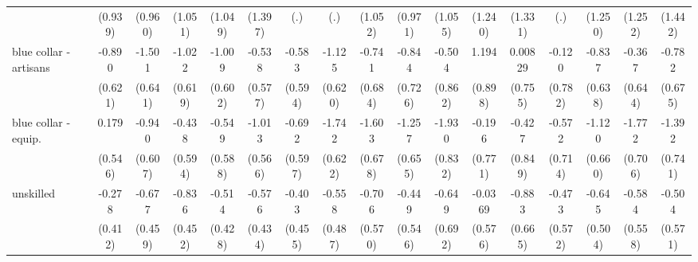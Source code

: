 {\begin{tabular}{l*{16}{c}}
                    &     (0.939)         &     (0.960)         &     (1.051)         &     (1.049)         &     (1.397)         &         (.)         &         (.)         &     (1.052)         &     (0.971)         &     (1.055)         &     (1.240)         &     (1.331)         &         (.)         &     (1.250)         &     (1.252)         &     (1.442)         \\
[1em]
blue collar - artisans&      -0.890         &      -1.501\sym{*}  &      -1.022         &      -1.009         &      -0.538         &      -0.583         &      -1.125         &      -0.741         &      -0.844         &      -0.504         &       1.194         &     0.00829         &      -0.120         &      -0.837         &      -0.367         &      -0.782         \\
                    &     (0.621)         &     (0.641)         &     (0.619)         &     (0.602)         &     (0.577)         &     (0.594)         &     (0.620)         &     (0.684)         &     (0.726)         &     (0.862)         &     (0.898)         &     (0.755)         &     (0.782)         &     (0.638)         &     (0.644)         &     (0.675)         \\
[1em]
blue collar - equip.&       0.179         &      -0.940         &      -0.438         &      -0.549         &      -1.013         &      -0.692         &      -1.742\sym{**} &      -1.603\sym{*}  &      -1.257         &      -1.930\sym{*}  &      -0.196         &      -0.427         &      -0.572         &      -1.120         &      -1.772\sym{*}  &      -1.392         \\
                    &     (0.546)         &     (0.607)         &     (0.594)         &     (0.588)         &     (0.566)         &     (0.597)         &     (0.622)         &     (0.678)         &     (0.655)         &     (0.832)         &     (0.771)         &     (0.849)         &     (0.714)         &     (0.660)         &     (0.706)         &     (0.741)         \\
[1em]
unskilled           &      -0.278         &      -0.677         &      -0.836         &      -0.514         &      -0.576         &      -0.403         &      -0.558         &      -0.706         &      -0.449         &      -0.649         &     -0.0369         &      -0.883         &      -0.473         &      -0.645         &      -0.584         &      -0.504         \\
                    &     (0.412)         &     (0.459)         &     (0.452)         &     (0.428)         &     (0.434)         &     (0.455)         &     (0.487)         &     (0.570)         &     (0.546)         &     (0.692)         &     (0.576)         &     (0.665)         &     (0.572)         &     (0.504)         &     (0.558)         &     (0.571)         \\

\end{tabular}}
